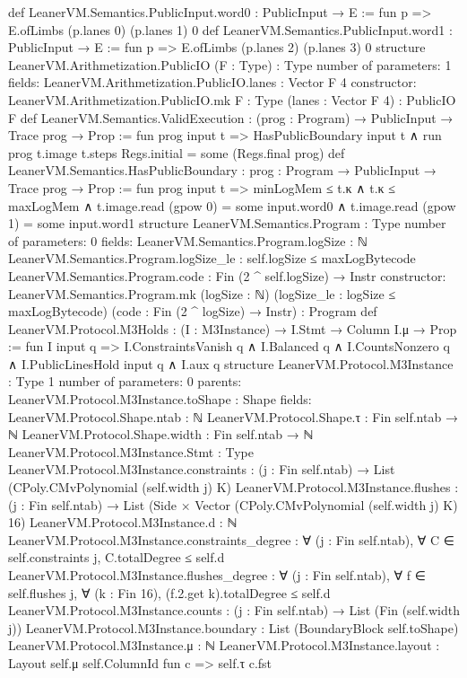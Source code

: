 \begin{srccode}[numbers=left,numbersep=3pt]
def LeanerVM.Semantics.PublicInput.word0 : PublicInput → E :=
fun p => E.ofLimbs (p.lanes 0) (p.lanes 1) 0
def LeanerVM.Semantics.PublicInput.word1 : PublicInput → E :=
fun p => E.ofLimbs (p.lanes 2) (p.lanes 3) 0
structure LeanerVM.Arithmetization.PublicIO (F : Type) : Type
number of parameters: 1
fields:
  LeanerVM.Arithmetization.PublicIO.lanes : Vector F 4
constructor:
  LeanerVM.Arithmetization.PublicIO.mk {F : Type} (lanes : Vector F 4) : PublicIO F
def LeanerVM.Semantics.ValidExecution : (prog : Program) → PublicInput → Trace prog → Prop :=
fun prog input t => HasPublicBoundary input t ∧ run prog t.image t.steps Regs.initial = some (Regs.final prog)
def LeanerVM.Semantics.HasPublicBoundary : {prog : Program} → PublicInput → Trace prog → Prop :=
fun {prog} input t =>
  minLogMem ≤ t.κ ∧
    t.κ ≤ maxLogMem ∧ t.image.read (gpow 0) = some input.word0 ∧ t.image.read (gpow 1) = some input.word1
structure LeanerVM.Semantics.Program : Type
number of parameters: 0
fields:
  LeanerVM.Semantics.Program.logSize : ℕ
  LeanerVM.Semantics.Program.logSize_le : self.logSize ≤ maxLogBytecode
  LeanerVM.Semantics.Program.code : Fin (2 ^ self.logSize) → Instr
constructor:
  LeanerVM.Semantics.Program.mk (logSize : ℕ) (logSize_le : logSize ≤ maxLogBytecode)
    (code : Fin (2 ^ logSize) → Instr) : Program
def LeanerVM.Protocol.M3Holds : (I : M3Instance) → I.Stmt → Column I.μ → Prop :=
fun I input q => I.ConstraintsVanish q ∧ I.Balanced q ∧ I.CountsNonzero q ∧ I.PublicLinesHold input q ∧ I.aux q
structure LeanerVM.Protocol.M3Instance : Type 1
number of parameters: 0
parents:
  LeanerVM.Protocol.M3Instance.toShape : Shape
fields:
  LeanerVM.Protocol.Shape.ntab : ℕ
  LeanerVM.Protocol.Shape.τ : Fin self.ntab → ℕ
  LeanerVM.Protocol.Shape.width : Fin self.ntab → ℕ
  LeanerVM.Protocol.M3Instance.Stmt : Type
  LeanerVM.Protocol.M3Instance.constraints : (j : Fin self.ntab) → List (CPoly.CMvPolynomial (self.width j) K)
  LeanerVM.Protocol.M3Instance.flushes : (j : Fin self.ntab) →
      List (Side × Vector (CPoly.CMvPolynomial (self.width j) K) 16)
  LeanerVM.Protocol.M3Instance.d : ℕ
  LeanerVM.Protocol.M3Instance.constraints_degree : ∀ (j : Fin self.ntab),
      ∀ C ∈ self.constraints j, C.totalDegree ≤ self.d
  LeanerVM.Protocol.M3Instance.flushes_degree : ∀ (j : Fin self.ntab),
      ∀ f ∈ self.flushes j, ∀ (k : Fin 16), (f.2.get k).totalDegree ≤ self.d
  LeanerVM.Protocol.M3Instance.counts : (j : Fin self.ntab) → List (Fin (self.width j))
  LeanerVM.Protocol.M3Instance.boundary : List (BoundaryBlock self.toShape)
  LeanerVM.Protocol.M3Instance.μ : ℕ
  LeanerVM.Protocol.M3Instance.layout : Layout self.μ self.ColumnId fun c => self.τ c.fst

\end{srccode}
